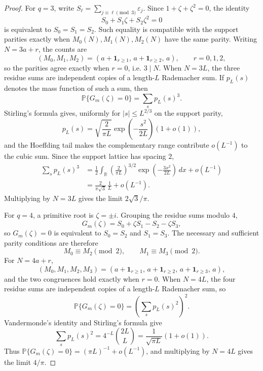 \documentclass[11pt]{amsart}
\numberwithin{equation}{section}
\theoremstyle{definition}
\theoremstyle{remark}
\newcommand{\Prob}{\mathbb P}
\newcommand{\abs}[1]{\left\lvert #1\right\rvert}
\begin{document}
\begin{proof}
For \(q=3\), write \(S_\ell=\sum_{j\equiv\ell\pmod3}\varepsilon_j\).  Since
\(1+\zeta+\zeta^2=0\), the identity
\[
  S_0+S_1\zeta+S_2\zeta^2=0
\]
is equivalent to \(S_0=S_1=S_2\).  Such equality is compatible with the support
parities exactly when \(M_0(N),M_1(N),M_2(N)\) have the same parity.  Writing
\(N=3a+r\), the counts are
\[
  (M_0,M_1,M_2)=(a+\mathbf 1_{r\ge1},\,a+\mathbf 1_{r\ge2},\,a),
  \qquad r=0,1,2,
\]
so the parities agree exactly when \(r=0\), i.e. \(3\mid N\).  When \(N=3L\),
the three residue sums are independent copies of a length-\(L\) Rademacher sum.
If \(p_L(s)\) denotes the mass function of such a sum, then
\[
  \Prob\{G_m(\zeta)=0\}=\sum_s p_L(s)^3.
\]
Stirling's formula gives, uniformly for \(\abs{s}\le L^{2/3}\) on the support
parity,
\[
  p_L(s)=\sqrt{\frac{2}{\pi L}}\exp\!\left(-\frac{s^2}{2L}\right)(1+o(1)),
\]
and the Hoeffding tail makes the complementary range contribute \(o(L^{-1})\)
to the cubic sum.  Since the support lattice has spacing \(2\),
\[
\begin{aligned}
  \sum_s p_L(s)^3
  &=\frac12\int_{\mathbb R}
      \left(\frac{2}{\pi L}\right)^{3/2}
      \exp\!\left(-\frac{3x^2}{2L}\right)\,dx+o(L^{-1})  \\
  &=\frac{2}{\pi\sqrt3}\,\frac1L+o(L^{-1}).
\end{aligned}
\]
Multiplying by \(N=3L\) gives the limit \(2\sqrt3/\pi\).

For \(q=4\), a primitive root is \(\zeta=\pm i\).  Grouping the residue sums
modulo \(4\),
\[
  G_m(\zeta)=S_0+\zeta S_1-S_2-\zeta S_3,
\]
so \(G_m(\zeta)=0\) is equivalent to \(S_0=S_2\) and \(S_1=S_3\).  The necessary
and sufficient parity conditions are therefore
\[
  M_0\equiv M_2\pmod2,\qquad M_1\equiv M_3\pmod2.
\]
For \(N=4a+r\),
\[
  (M_0,M_1,M_2,M_3)=
  (a+\mathbf 1_{r\ge1},\,a+\mathbf 1_{r\ge2},\,
   a+\mathbf 1_{r\ge3},\,a),
\]
and the two congruences hold exactly when \(r=0\).  When \(N=4L\), the four
residue sums are independent copies of a length-\(L\) Rademacher sum, so
\[
  \Prob\{G_m(\zeta)=0\}
  =\left(\sum_s p_L(s)^2\right)^2.
\]
Vandermonde's identity and Stirling's formula give
\[
  \sum_s p_L(s)^2
  =4^{-L}\binom{2L}{L}
  =\frac1{\sqrt{\pi L}}(1+o(1)).
\]
Thus \(\Prob\{G_m(\zeta)=0\}=(\pi L)^{-1}+o(L^{-1})\), and multiplying by
\(N=4L\) gives the limit \(4/\pi\).


\end{proof}
\end{document}
